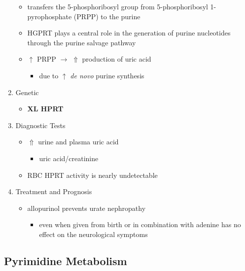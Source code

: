 \documentclass[12pt]{scrartcl}
\begin{document}
\begin{enumerate}

\begin{itemize}
\item transfers the 5-phosphoribosyl group from 5-phosphoribosyl
1-pyrophosphate (PRPP) to the purine
\item HGPRT plays a central role in the generation of purine nucleotides
through the purine salvage pathway
\item \(\uparrow\) PRPP \(\to\) \(\Uparrow\) production of uric acid
\begin{itemize}
\item due to \(\uparrow\) \emph{de novo} purine synthesis
\end{itemize}
\end{itemize}

\item Genetic
\label{sec:orgfc3e740}
\begin{itemize}
\item \textbf{XL HPRT}
\end{itemize}

\item Diagnostic Tests
\label{sec:org3b25a7f}
\begin{itemize}
\item \(\Uparrow\) urine and plasma uric acid
\begin{itemize}
\item uric acid/creatinine
\end{itemize}
\item RBC HPRT activity is nearly undetectable
\end{itemize}

\item Treatment and Prognosis
\label{sec:orgf23fb34}
\begin{itemize}
\item allopurinol prevents urate nephropathy
\begin{itemize}
\item even when given from birth or in combination with adenine has no
effect on the neurological symptoms
\end{itemize}
\end{itemize}
\end{enumerate}

\subsection{Pyrimidine Metabolism}
\label{sec:org4b0f2b5}
\end{document}
